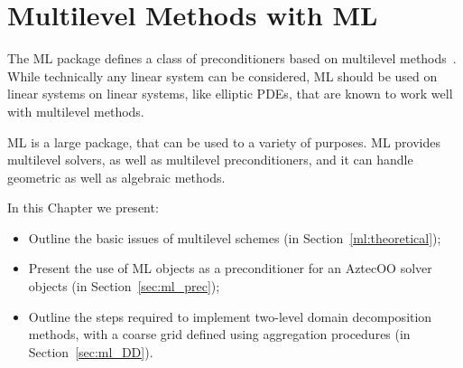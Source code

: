 % 
% 
% 
%  
%  
% 

\section{Multilevel Methods with ML}
\label{chap:ml}

The ML package defines a class of preconditioners based on multilevel
methods~\cite{TuminaroTong:00a}. While technically any linear system can
be considered, ML should be used on linear systems on linear systems,
like elliptic PDEs, that are known to work well with multilevel methods.

ML is a large package, that can be used to a variety of purposes. ML
provides multilevel solvers, as well as multilevel preconditioners, and
it can handle geometric as well as algebraic methods.

In this Chapter we present:
\begin{itemize}
\item Outline the basic issues of multilevel schemes (in
  Section~\ref{ml:theoretical});
\item Present the use of ML objects as a preconditioner for an AztecOO
  solver objects (in Section~\ref{sec:ml_prec});
\item Outline the steps required to implement two-level domain
  decomposition methods, with a coarse grid defined using aggregation
  procedures (in Section~\ref{sec:ml_DD}).
\end{itemize}

